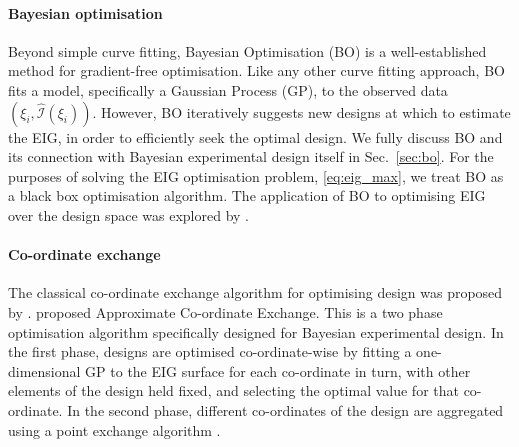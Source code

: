 \documentclass[a4paper, 10pt]{report}
\theoremstyle{plain}
\begin{document}
	\paragraph{Bayesian optimisation}
	Beyond simple curve fitting, Bayesian Optimisation (BO) \citep{snoek2012practical} is a well-established method for gradient-free optimisation.
	Like any other curve fitting approach, BO fits a model, specifically a Gaussian Process (GP), \citep{williams2006gaussian} to the observed data $(\xi_i, \hat{\mathcal{I}}(\xi_i))$.
	However, BO iteratively suggests new designs at which to estimate the EIG, in order to efficiently seek the optimal design.
	We fully discuss BO and its connection with Bayesian experimental design itself in Sec.~\ref{sec:bo}.
	For the purposes of solving the EIG optimisation problem, \eqref{eq:eig_max}, we treat BO as a black box optimisation algorithm.
	The application of BO to optimising EIG over the design space was explored by \citet{kleinegesse2018efficient,foster2019variational,von2019optimal}.
	
	\paragraph{Co-ordinate exchange}
	The classical co-ordinate exchange algorithm for optimising design was proposed by \citet{meyer1995coordinate}.
	\citet{overstall2017bayesian} proposed Approximate Co-ordinate Exchange. 
	This is a two phase optimisation algorithm specifically designed for Bayesian experimental design.
	In the first phase, designs are optimised co-ordinate-wise by fitting a one-dimensional GP to the EIG surface for each co-ordinate in turn, with other elements of the design held fixed, and selecting the optimal value for that co-ordinate.
	In the second phase, different co-ordinates of the design are aggregated using a point exchange algorithm \citep{meyer1995coordinate,atkinson2007optimum}.
	
\end{document}
